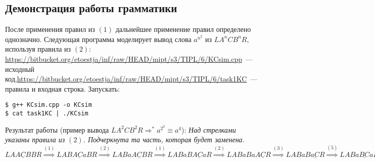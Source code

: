 \documentclass[a4paper]{article}
\begin{document}
\subsection*{Демонстрация работы грамматики}
После применения правил из $(1)$ дальнейшее применение правил определено однозначно. Следующая программа моделирует вывод слова $a^{n^2}$ из $LA^nCB^nR$, используя правила из $(2)$:\newline
\href{https://bitbucket.org/etoestja/inf/raw/HEAD/mipt/s3/TIPL/6/KCsim.cpp}{https://bitbucket.org/etoestja/inf/raw/HEAD/mipt/s3/TIPL/6/KCsim.cpp}~--- исходный код,\newline \href{https://bitbucket.org/etoestja/inf/raw/HEAD/mipt/s3/TIPL/6/task1KC}{https://bitbucket.org/etoestja/inf/raw/HEAD/mipt/s3/TIPL/6/task1KC}~--- правила и входная строка. Запускать:
\begin{verbatim}
$ g++ KCsim.cpp -o KCsim
$ cat task1KC | ./KCsim
\end{verbatim}
Результат работы (пример вывода $LA^2CB^2R\Longrightarrow^* a^{2^2}\equiv a^4$):\newline
{\em Над стрелками указаны правила из $(2)$. Подчеркнута та часть, которая будет заменена.}\newline
$LA\underline{ACB}BR \overset{(1)}{\Longrightarrow}LAB\underline{ACa}BR \overset{(2)}{\Longrightarrow}LABa\underline{ACB}R \overset{(1)}{\Longrightarrow}LABaB\underline{ACa}R \overset{(2)}{\Longrightarrow}LABaBa\underline{ACR} \overset{(3)}{\Longrightarrow}LABaB\underline{aC}R \overset{(5)}{\Longrightarrow}LABa\underline{BC}aR \overset{(4)}{\Longrightarrow}LAB\underline{aC}BaR \overset{(5)}{\Longrightarrow}LA\underline{BC}aBaR \overset{(4)}{\Longrightarrow}L\underline{ACB}aBaR \overset{(1)}{\Longrightarrow}LB\underline{ACa}aBaR \overset{(2)}{\Longrightarrow}LBa\underline{ACa}BaR \overset{(2)}{\Longrightarrow}LBaa\underline{ACB}aR \overset{(1)}{\Longrightarrow}LBaaB\underline{ACa}aR \overset{(2)}{\Longrightarrow}LBaaBa\underline{ACa}R \overset{(2)}{\Longrightarrow}LBaaBaa\underline{ACR} \overset{(3)}{\Longrightarrow}LBaaBa\underline{aC}R \overset{(5)}{\Longrightarrow}LBaaB\underline{aC}aR \overset{(5)}{\Longrightarrow}LBaa\underline{BC}aaR \overset{(4)}{\Longrightarrow}LBa\underline{aC}BaaR \overset{(5)}{\Longrightarrow}LB\underline{aC}aBaaR \overset{(5)}{\Longrightarrow}L\underline{BC}aaBaaR \overset{(4)}{\Longrightarrow}\underline{LCB}aaBaaR \overset{(8)}{\Longrightarrow}\underline{LCa}aBaaR \overset{(7)}{\Longrightarrow}a\underline{LCa}BaaR \overset{(7)}{\Longrightarrow}aa\underline{LCB}aaR \overset{(8)}{\Longrightarrow}aa\underline{LCa}aR \overset{(7)}{\Longrightarrow}aaa\underline{LCa}R \overset{(7)}{\Longrightarrow}aaaa\underline{LCR} \overset{(9)}{\Longrightarrow}aaaa$
\end{document}
